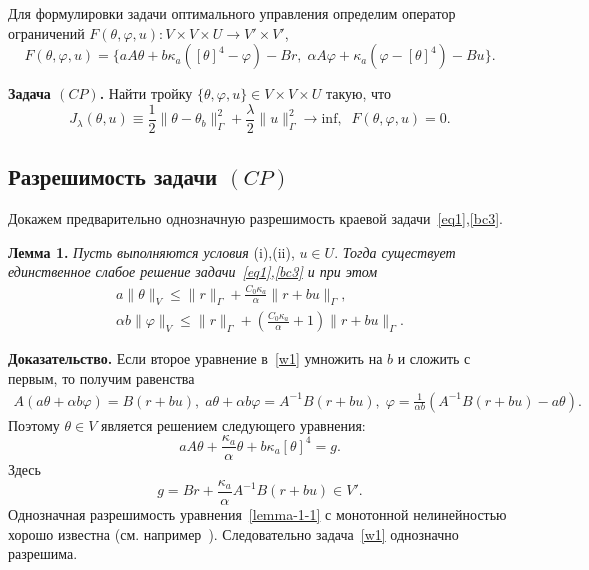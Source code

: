 Для формулировки задачи оптимального управления определим оператор
ограничений $F(\theta, \varphi, u) : V \times V \times U \rightarrow V' \times V'$,
\[
    F(\theta, \varphi, u) = \{ aA\theta + b \kappa_a ( [\theta]^4- \varphi) - Br,\;
    \alpha A \varphi + \kappa_a (\varphi -[\theta]^4) - Bu\}.
\]


\textbf{Задача $(CP)$.} Найти тройку $\{\theta, \varphi, u \} \in V \times V \times U$
такую, что
\begin{equation}
    \label{CP}
    J_\lambda(\theta, u) \equiv \frac{1}{2}\|\theta -\theta_b\|^2_\Gamma
    + \frac{\lambda}{2}\|u\|^2_\Gamma \rightarrow \text{inf},\;\; F(\theta, \varphi, u)=0.
\end{equation}

\subsection{Разрешимость задачи $(CP)$}\label{2_solvability}


    Докажем предварительно однозначную разрешимость краевой задачи~\eqref{eq1},\eqref{bc3}.

    \textbf{Лемма 1.}
    \textit{Пусть выполняются условия} (i),(ii), $u\in U$. \textit{Тогда
    существует единственное слабое решение задачи~\eqref{eq1},\eqref{bc3} и при этом}
    \begin{equation}
        \label{E1}
        \begin{aligned}
            a\|\theta\|_V \leq \|r\|_\Gamma + \frac{C_0\kappa_a}{\alpha}\|r+bu\|_\Gamma, \\
            \alpha b \|\varphi\|_V \leq \|r\|_\Gamma +
            \left(\frac{C_0\kappa_a}{\alpha} + 1\right)\|r+bu\|_\Gamma.
        \end{aligned}
    \end{equation}

    \textbf{Доказательство.}
    Если второе уравнение в~\eqref{w1} умножить на $b$ и сложить с первым, то получим равенства
    \begin{gather*}
        A \left( a \theta + \alpha b \varphi \right) = B(r + bu),\;
        a\theta + \alpha b \varphi = A^{-1}B(r + bu),\;
        \varphi = \frac{1}{\alpha b}(A^{-1}B(r +bu) - a\theta).
    \end{gather*}
    Поэтому $\theta \in V$ является решением следующего уравнения:
    \begin{equation}
        \label{lemma-1-1}
        a A \theta + \frac{\kappa_a}{\alpha} \theta + b\kappa_a [\theta]^4 = g.
    \end{equation}
    Здесь \[ g = Br + \frac{\kappa_a}{\alpha}A^{-1}B(r+bu) \in V'. \]
    Однозначная разрешимость уравнения~\eqref{lemma-1-1} с монотонной нелинейностью
    хорошо известна (см.
    например~\cite{Kufner}).
    Следовательно задача~\eqref{w1} однозначно разрешима.


